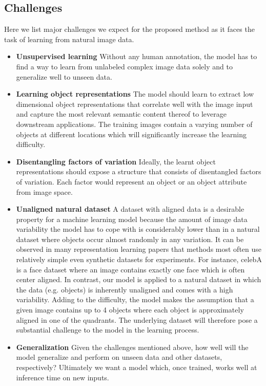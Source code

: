 \documentclass[a4paper,12pt]{report}
\begin{document}
\subsection{Challenges}
Here we list major challenges we expect for the proposed method as it faces the task of learning from natural image data.
\begin{itemize}
  \item \textbf{Unsupervised learning} Without any human annotation, the model has to find a way to learn from unlabeled complex image data solely and to generalize well to unseen data.
  \item \textbf{Learning object representations} The model should learn to extract low dimensional object representations that correlate well with the image input and capture the most relevant semantic content thereof to leverage downstream applications. The training images contain a varying number of objects at different locations which will significantly increase the learning difficulty.
  \item \textbf{Disentangling factors of variation} Ideally, the learnt object representations should expose a structure that consists of disentangled factors of variation. Each factor would represent an object or an object attribute from image space.
  \item \textbf{Unaligned natural dataset} A dataset with aligned data is a desirable property for a machine learning model because the amount of image data variability the model has to cope with is considerably lower than in a natural dataset where objects occur almost randomly in any variation. It can be observed in many representation learning papers that methods most often use relatively simple even synthetic datasets for experiments. For instance, celebA is a face dataset where an image contains exactly one face which is often center aligned. In contrast, our model is applied to a natural dataset in which the data (e.g. objects) is inherently unaligned and comes with a high variability. Adding to the difficulty, the model makes the assumption that a given image contains up to 4 objects where each object is approximately aligned in one of the quadrants. The underlying dataset will therefore pose a substantial challenge to the model in the learning process.
  \item \textbf{Generalization} Given the challenges mentioned above, how well will the model generalize and perform on unseen data and other datasets, respectively? Ultimately we want a model which, once trained, works well at inference time on new inputs. 
\end{itemize}
\end{document}
